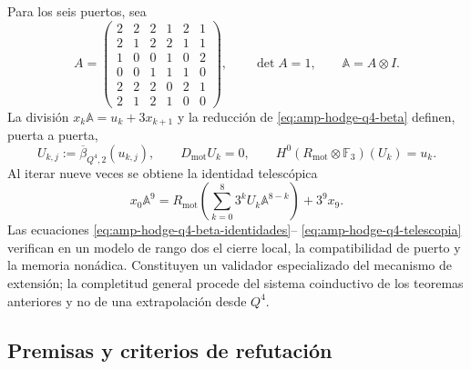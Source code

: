 Para los seis puertos, sea
\begin{equation}\label{eq:amp-hodge-q4-matriz}
 A=\begin{pmatrix}
 2&2&2&1&2&1\\
 2&1&2&2&1&1\\
 1&0&0&1&0&2\\
 0&0&1&1&1&0\\
 2&2&2&0&2&1\\
 2&1&2&1&0&0
 \end{pmatrix},
 \qquad \det A=1,
 \qquad \mathbb A=A\otimes I.
\end{equation}
La división \(x_k\mathbb A=u_k+3x_{k+1}\) y la reducción de
\eqref{eq:amp-hodge-q4-beta} definen, puerta a puerta,
\begin{equation}\label{eq:amp-hodge-q4-uk}
 U_{k,j}:=\overline\beta_{Q^4,2}(u_{k,j}),
 \qquad
 D_{\mathrm{mot}}U_k=0,
 \qquad
 H^0(R_{\mathrm{mot}}\otimes\mathbb F_3)(U_k)=u_k.
\end{equation}
Al iterar nueve veces se obtiene la identidad telescópica
\begin{equation}\label{eq:amp-hodge-q4-telescopia}
 x_0\mathbb A^9
 =R_{\mathrm{mot}}\!\left(
   \sum_{k=0}^{8}3^kU_k\mathbb A^{8-k}\right)+3^9x_9.
\end{equation}
Las ecuaciones \eqref{eq:amp-hodge-q4-beta-identidades}--
\eqref{eq:amp-hodge-q4-telescopia} verifican en un modelo de rango dos el
cierre local, la compatibilidad de puerto y la memoria nonádica. Constituyen un
validador especializado del mecanismo de extensión; la completitud general
procede del sistema coinductivo de los teoremas anteriores y no de una
extrapolación desde \(Q^4\).

\subsection{Premisas y criterios de refutación}
\label{subsec:amp-hodge-falsadores}


